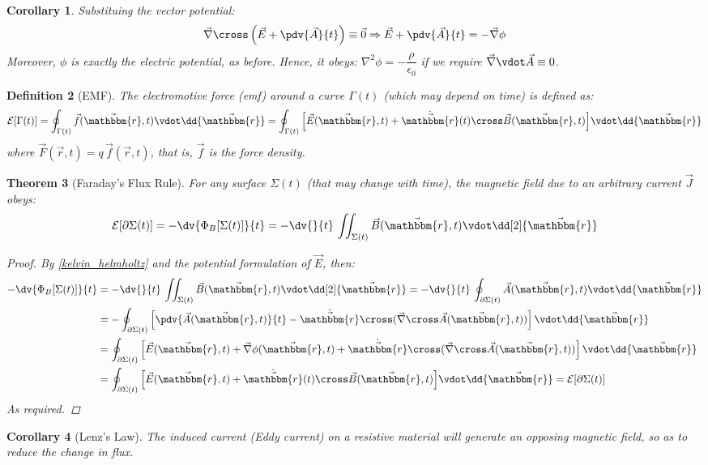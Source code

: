 \documentclass[12pt]{article}
\let\RA\Rightarrow
\renewcommand{\grad}{\vec{\nabla}}
\renewcommand{\div}{\vec{\nabla}\vdot}
\renewcommand{\curl}{\vec{\nabla}\cross}
\newcommand*{\lapl}{\nabla^2}
\newcommand*{\rv}{\vec{r}}
\newcommand*{\vF}{\vec{F}}
\newcommand*{\irv}{\vec{\mathbbm{r}}}
\newcommand*{\vE}{\vec{E}}
\newcommand*{\vB}{\vec{B}}
\newcommand*{\vJ}{\vec{J}}
\newcommand*{\vA}{\vec{A}}
\newcommand*{\ee}{\epsilon_0}
\newtheorem{theorem}{Theorem}[subsection]
\newtheorem{definition}[theorem]{Definition}
\newtheorem{corollary}[theorem]{Corollary}
\begin{document}
\begin{corollary}
  Substituing the vector potential: $$\curl\left(\vE+\pdv{\vA}{t}\right)\equiv\vec{0}\RA \vE+\pdv{\vA}{t}=-\grad\phi$$ Moreover, $\phi$ is exactly the electric potential, as before. Hence, it obeys: $\lapl\phi=-\dfrac{\rho}{\ee}$ if we require $\div\vA\equiv 0$.
\end{corollary}

\begin{definition}[EMF]
  The electromotive force (emf) around a curve $\Gamma(t)$ (which may depend on time) is defined as:
  $$\mathcal{E}[\Gamma(t)]=\oint_{\Gamma(t)}\vec{f}(\irv,t)\vdot\dd{\irv}=\oint_{\Gamma(t)}\Big[\vE(\irv,t)+\dot{\irv}(t)\cross\vB(\irv,t)\Big]\vdot\dd{\irv}$$ where $\vF(\rv,t)=q\,\vec{f}(\rv,t)$, that is, $\vec{f}$ is the force density.
\end{definition}

\begin{theorem}[Faraday's Flux Rule]
  For any surface $\Sigma(t)$ (that may change with time), the magnetic field due to an arbitrary current $\vJ$ obeys:
  $$\mathcal{E}[\partial\Sigma(t)]=-\dv{\Phi_B[\Sigma(t)]}{t}=-\dv{}{t}\,\iint_{\Sigma(t)}\vB(\irv,t)\vdot\dd[2]{\irv}$$
  \begin{proof}
    By \ref{kelvin_helmholtz} and the potential formulation of $\vE$, then:
    \begin{align*}
      -\dv{\Phi_B[\Sigma(t)]}{t}&=-\dv{}{t}\,\iint_{\Sigma(t)}\vB(\irv,t)\vdot\dd[2]{\irv}=-\dv{}{t}\,\oint_{\partial\Sigma(t)}\vA(\irv,t)\vdot\dd{\irv}\\
      &=-\oint_{\partial\Sigma(t)}\left[\pdv{\vA(\irv,t)}{t}-\dot{\irv}\cross(\curl\vA(\irv,t))\right]\vdot\dd{\irv}\\
      &=\oint_{\partial\Sigma(t)}\left[\vE(\irv,t)+\grad\phi(\irv,t)+\dot{\irv}\cross(\curl\vA(\irv,t))\right]\vdot\dd{\irv}\\
      &=\oint_{\partial\Sigma(t)}\Big[\vE(\irv,t)+\dot{\irv}(t)\cross\vB(\irv,t)\Big]\vdot\dd{\irv}=\mathcal{E}[\partial\Sigma(t)]
    \end{align*}
    As required.
  \end{proof}
\end{theorem}

\begin{corollary}[Lenz's Law]
  The induced current (Eddy current) on a resistive material will generate an opposing magnetic field, so as to reduce the change in flux.
\end{corollary}
\end{document}
